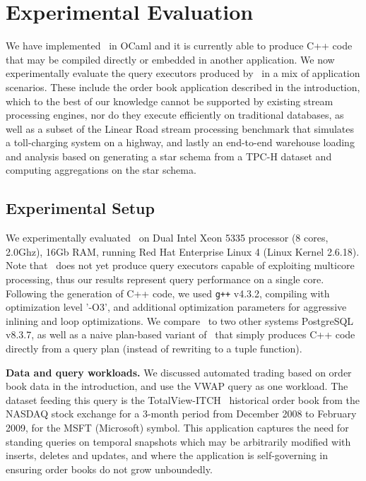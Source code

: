 \section{Experimental Evaluation}

We have implemented \compiler\ in OCaml and it is currently able to produce C++
code that may be compiled directly or embedded in another application. We now
experimentally evaluate the query executors produced by \compiler\ in a mix of
application scenarios. These include the order book application described in the
introduction, which to the best of our knowledge cannot be supported by existing
stream processing engines, nor do they execute efficiently on traditional
databases, as well as a subset of the Linear Road stream processing benchmark
that simulates a toll-charging system on a highway, and lastly an end-to-end
warehouse loading and analysis based on generating a star schema from a TPC-H
dataset and computing aggregations on the star schema.

\subsection{Experimental Setup}
We experimentally evaluated \compiler\ on Dual Intel Xeon 5335 processor (8
cores, 2.0Ghz), 16Gb RAM, running Red Hat Enterprise Linux 4 (Linux Kernel
2.6.18). Note that \compiler\ does not yet produce query executors capable of
exploiting multicore processing, thus our results represent query performance on
a single core. Following the generation of C++ code, we used \texttt{g++} v4.3.2,
compiling with optimization level '-O3', and additional optimization parameters
for aggressive inlining and loop optimizations. We compare \compiler\ to two
other systems PostgreSQL v8.3.7, as well as a naive plan-based variant of
\compiler\ that simply produces C++ code directly from a query plan (instead of
rewriting to a tuple function).

\textbf{Data and query workloads.}
We discussed automated trading based on order book data in the introduction, and
use the VWAP query as one workload. The dataset feeding this query is the
TotalView-ITCH~\cite{totalview-url} historical order book from the NASDAQ stock
exchange for a 3-month period from December 2008 to February 2009, for the MSFT
(Microsoft) symbol. This application captures the need for standing queries on
temporal snapshots which may be arbitrarily modified with inserts, deletes and
updates, and where the application is self-governing in ensuring order books do
not grow unboundedly.


